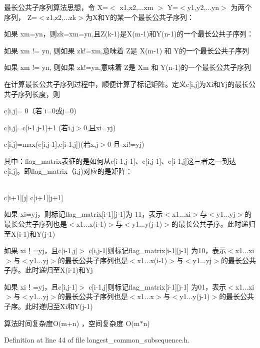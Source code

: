 \begin{DoxyItemize}
\item 最长公共子序列算法思想，令 X=$<$ x1,x2,...xm $>$ Y=$<$y1,y2,...yn$>$ 为两个序列， Z=$<$z1,z2,...zk$>$为\+X和\+Y的某一个最长公共子序列：
\begin{DoxyItemize}
\item 如果 xm=yn，则zk=xm=yn,且\+Z(k-\/1)是\+X(m-\/1)和\+Y(n-\/1)的一个最长公共子序列：
\item 如果 xm != yn, 则如果 zk!=xm,意味着 Z是 X(m-\/1) 和 Y的一个最长公共子序列
\item 如果 xm != yn, 则如果 zk!=yn,意味着 Z是 Xm 和 Y(n-\/1)的一个最长公共子序列
\end{DoxyItemize}

在计算最长公共子序列过程中，顺便计算了标记矩阵。定义c\mbox{[}i,j\mbox{]}为\+Xi和\+Yj的最长公共子序列长度，则
\item c\mbox{[}i,j\mbox{]}= 0（若 i=0或j=0)
\item c\mbox{[}i,j\mbox{]}=c\mbox{[}i-\/1,j-\/1\mbox{]}+1 (若i,j$>$0,且xi=yj)
\item c\mbox{[}i,j\mbox{]}=max(c\mbox{[}i,j-\/1\mbox{]},c\mbox{[}i-\/1,j\mbox{]})(若x,j$>$0 且 xi!=yj)
\end{DoxyItemize}

其中：flag\+\_\+matrix表征的是如何从c\mbox{[}i-\/1,j-\/1\mbox{]}、c\mbox{[}i,j-\/1\mbox{]}、c\mbox{[}i-\/1,j\mbox{]}这三者之一到达c\mbox{[}i,j\mbox{]}。即flag\+\_\+matrix（i,j)对应的是矩阵：

\begin{TabularC}{1}
\hline
{}\\
c\mbox{[}i+1\mbox{]}\mbox{[}j\mbox{]} c\mbox{[}i+1\mbox{]}\mbox{[}j+1\mbox{]} \\
\end{TabularC}

\begin{DoxyItemize}
\item 如果 xi=yj，则标记flag\+\_\+matrix\mbox{[}i-\/1\mbox{]}\mbox{[}j-\/1\mbox{]}为 11，表示$<$x1...xi$>$与$<$y1...\+yj$>$的最长公共子序列也是$<$x1...x(i-\/1)$>$与$<$y1...y(j-\/1)$>$的最长公共子序。此时递归至\+X(i-\/1)和\+Y(j-\/1)
\item 如果 xi！=yj，且c\mbox{[}i-\/1,j\mbox{]}$>$ c\mbox{[}i,j-\/1\mbox{]}则标记flag\+\_\+matrix\mbox{[}i-\/1\mbox{]}\mbox{[}j-\/1\mbox{]} 为10，表示$<$x1...\+xi$>$与$<$y1...\+yj$>$的最长公共子序列也是$<$x1...x(i-\/1)$>$与$<$y1...\+yj$>$的最长公共子序。此时递归至\+X(i-\/1)和\+Yj
\item 如果 xi！=yj，且c\mbox{[}i,j-\/1\mbox{]}$>$ c\mbox{[}i-\/1,j\mbox{]}则标记flag\+\_\+matrix\mbox{[}i-\/1\mbox{]}\mbox{[}j-\/1\mbox{]} 为01，表示$<$x1...\+xi$>$与$<$y1...\+yj$>$的最长公共子序列也是$<$x1...\+x$>$与$<$y1...y(j-\/1)$>$的最长公共子序。此时递归至\+Xi和\+Y(j-\/1)
\end{DoxyItemize}

算法时间复杂度\+O(m+n) ，空间复杂度 O(m$\ast$n) 

Definition at line 44 of file longest\+\_\+common\+\_\+subsequence.\+h.

